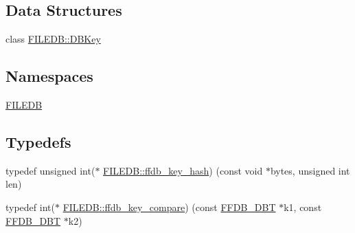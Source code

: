 \subsection*{Data Structures}
\begin{DoxyCompactItemize}
\item 
class \mbox{\hyperlink{classFILEDB_1_1DBKey}{F\+I\+L\+E\+D\+B\+::\+D\+B\+Key}}
\end{DoxyCompactItemize}
\subsection*{Namespaces}
\begin{DoxyCompactItemize}
\item 
 \mbox{\hyperlink{namespaceFILEDB}{F\+I\+L\+E\+DB}}
\end{DoxyCompactItemize}
\subsection*{Typedefs}
\begin{DoxyCompactItemize}
\item 
typedef unsigned int($\ast$ \mbox{\hyperlink{namespaceFILEDB_a62446cf48b614494d5708110ddc414bf}{F\+I\+L\+E\+D\+B\+::ffdb\+\_\+key\+\_\+hash}}) (const void $\ast$bytes, unsigned int len)
\item 
typedef int($\ast$ \mbox{\hyperlink{namespaceFILEDB_a1d3bd589ccfab62ecdd78b46aba576e2}{F\+I\+L\+E\+D\+B\+::ffdb\+\_\+key\+\_\+compare}}) (const \mbox{\hyperlink{adat-devel_2other__libs_2filedb_2filehash_2ffdb__db_8h_aa2e0984399491df0fdd20898ca8758f9}{F\+F\+D\+B\+\_\+\+D\+BT}} $\ast$k1, const \mbox{\hyperlink{adat-devel_2other__libs_2filedb_2filehash_2ffdb__db_8h_aa2e0984399491df0fdd20898ca8758f9}{F\+F\+D\+B\+\_\+\+D\+BT}} $\ast$k2)
\end{DoxyCompactItemize}
